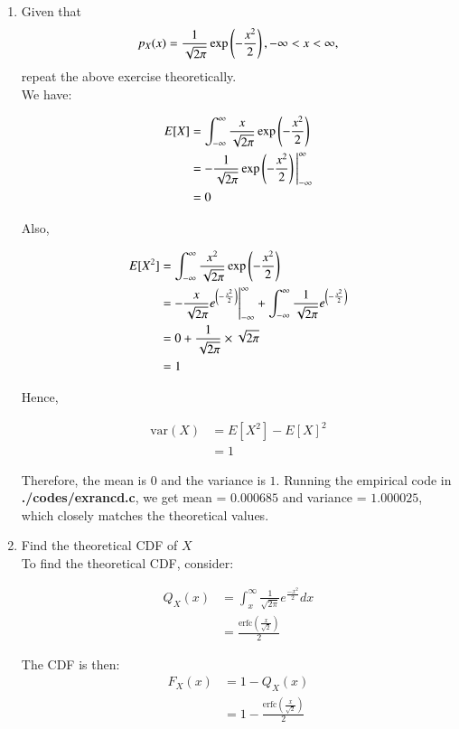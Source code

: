 \documentclass[journal,12pt,twocolumn]{IEEEtran}
\renewcommand\thesection{\arabic{section}}
\begin{document}
\begin{enumerate}[label=\thesection.\arabic*
,ref=\thesection.\theenumi]
\item Given that 
\begin{align}
p_{X}(x) = \frac{1}{\sqrt{2\pi}}\exp\left(-\frac{x^2}{2}\right), -\infty < x < \infty,
\end{align}
repeat the above exercise theoretically.
\\
\solution  We have:
    
\begin{align}
    E[X] &=  \int_{-\infty}^{\infty} \frac{x}{\sqrt{2\pi}}\exp{\left(-\frac{x^2}{2}\right)} \\
    &= -\frac{1}{\sqrt{2\pi}}\exp\left(-\frac{x^2}{2}\right) \Bigg{|}_{-\infty}^{\infty} \\
    &= 0 
\end{align}

Also,
    
\begin{align}
    E[X^2] &=  \int_{-\infty}^{\infty} \frac{x^2}{\sqrt{2\pi}}\exp{\left(-\frac{x^2}{2}\right)} \\
    &= -\frac{x}{\sqrt{2\pi}}e^{\left(-\frac{x^2}{2}\right)} \Bigg{|}_{-\infty}^{\infty} + \int_{-\infty}^{\infty} \frac{1}{\sqrt{2\pi}}e^{\left(-\frac{x^2}{2}\right)}   \\
    &= 0 + \frac{1}{\sqrt{2\pi}} \times \sqrt{2\pi} \\
    &= 1
\end{align}

Hence, 

\begin{align}
    \text{var}(X) &= E[X^2] - E[X]^2 \\ 
    &= 1 
\end{align}

Therefore, the mean is $0$ and the variance is $1$. Running the empirical code in \textbf{./codes/exrancd.c}, 
   we get mean = $0.000685$ and variance = $1.000025$, which closely matches the theoretical values.


\item Find the theoretical CDF of $X$
\\
\solution
 To find the theoretical CDF, consider:

\begin{align}
    Q_X(x) &= \int_x ^{\infty} \frac{1}{\sqrt{2\pi}} e^{\frac{-x^2}{2}} dx \\
      &= \frac{\text{erfc}(\frac{x}{\sqrt{2}})}{2}
   \end{align}

The CDF is then:
\begin{align}
    F_X(x) &= 1 - Q_X(x) \\
    &= 1 - \frac{\text{erfc}(\frac{x}{\sqrt{2}})}{2}
\end{align}

%
\end{enumerate}
\end{document}
